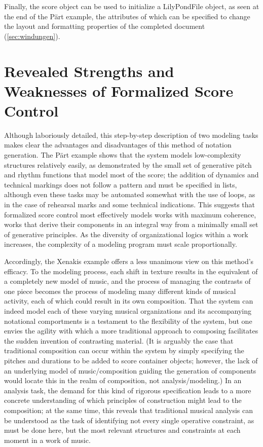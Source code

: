 Finally, the score object can be used to initialize a LilyPondFile object, as seen at the end of the P\"{a}rt example, the attributes of which can be specified to change the layout and formatting properties of the completed document (\ref{sec:windungen}).

\section{Revealed Strengths and Weaknesses of Formalized Score Control}
Although laboriously detailed, this step-by-step description of two modeling tasks makes clear the advantages and disadvantages of this method of notation generation. The P\"{a}rt example shows that the system models low-complexity structures relatively easily, as demonstrated by the small set of generative pitch and rhythm functions that model most of the score; the addition of dynamics and technical markings does not follow a pattern and must be specified in lists, although even these tasks may be automated somewhat with the use of loops, as in the case of rehearsal marks and some technical indications. This suggests that formalized score control most effectively models works with maximum coherence, works that derive their components in an integral way from a minimally small set of generative principles. As the diversity of organizational logics within a work increases, the complexity of a modeling program must scale proportionally. 

Accordingly, the Xenakis example offers a less unanimous view on this method's efficacy. To the modeling process, each shift in texture results in the equivalent of a completely new model of music, and the process of managing the contrasts of one piece becomes the process of modeling many different kinds of musical activity, each of which could result in its own composition. That the system can indeed model each of these varying musical organizations and its accompanying notational comportments is a testament to the flexibility of the system, but one envies the agility with which a more traditional approach to composing facilitates the sudden invention of contrasting material. (It is arguably the case that traditional composition can occur within the system by simply specifying the pitches and durations to be added to score container objects; however, the lack of an underlying model of music/composition guiding the generation of components would locate this in the realm of composition, not analysis/modeling.) In an analysis task, the demand for this kind of rigorous specification leads to a more concrete understanding of which principles of construction might lead to the composition; at the same time, this reveals that traditional musical analysis can be understood as the task of identifying not every single operative constraint, as must be done here, but the most relevant structures and constraints at each moment in a work of music.

